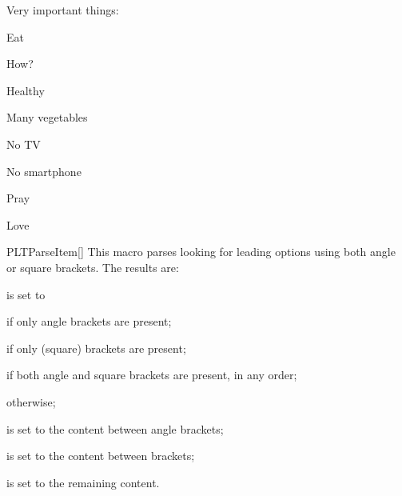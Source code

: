 \documentclass[a4paper, 11pt]{article}
\begin{document}
\begin{example}{}

    \begin{importantlisting}
        Very important things:\par
        \item Eat%
        \begin{importantlisting}
            How?
            \item Healthy
            \item Many vegetables
            \item No TV
            \item No smartphone
        \end{importantlisting}
        \par
        \item Pray\par
        \item Love\par
    \end{importantlisting}
\end{example}

\begin{macro}{PLTParseItem}[]
    This macro parses  looking for leading options using both angle or square brackets. The results are:
    \begin{itemizeitemize}
        \item {} is set to
        \begin{itemizeitemize}
            \item {} if only angle brackets are present;
            \item {} if only (square) brackets are present;
            \item {} if both angle and square brackets are present, in any order;
            \item {} otherwise;
        \end{itemizeitemize}
        \item {} is set to the content between angle brackets;
        \item {} is set to the content between brackets;
        \item {} is set to the remaining content.
    \end{itemizeitemize}
\end{macro}
\end{document}
